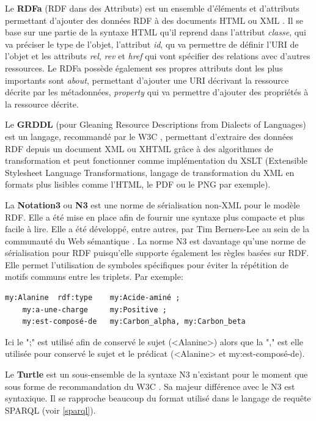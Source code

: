 Le \textbf{RDFa} (RDF dans des Attributs) est un ensemble d'éléments et d'attributs permettant d'ajouter des données RDF à des documents HTML ou XML \cite{adida2008rdfa}. Il se base sur une partie de la syntaxe HTML qu'il reprend dans l'attribut \textit{classe}, qui va préciser le type de l'objet, l'attribut \textit{id}, qu va permettre de définir l'URI de l'objet et les attributs \textit{rel}, \textit{rev} et \textit{href} qui vont spécifier des relations avec d'autres ressources. Le RDFa possède également ses propres attributs dont les plus importants sont \textit{about}, permettant d'ajouter une URI décrivant la ressource décrite par les métadonnées, \textit{property} qui va permettre d'ajouter des propriétés à la ressource décrite.

Le \textbf{GRDDL} (pour Gleaning Resource Descriptions from Dialects of Languages) est un langage, recommandé par le W3C \cite{connolly2007gleaning}, permettant d'extraire des données RDF depuis un document XML ou XHTML grâce à des algorithmes de transformation et peut fonctionner comme implémentation du XSLT (Extensible Stylesheet Language Transformations, langage de transformation du XML en formats plus lisibles comme l'HTML, le PDF ou le PNG par exemple).

La \textbf{Notation3} ou \textbf{N3} est une norme de sérialisation non-XML pour le modèle RDF. Elle a été mise en place afin de fournir une syntaxe plus compacte et plus facile à lire. Elle a été développé, entre autres, par Tim Berners-Lee au sein de la communauté du Web sémantique \cite{berners2008n3logic}. La norme N3 est davantage qu'une norme de sérialisation pour RDF puisqu'elle supporte également les règles basées sur RDF. Elle permet l'utilisation de symboles spécifiques pour éviter la répétition de motifs communs entre les triplets. Par exemple:

\begin{lstlisting}
my:Alanine	rdf:type 	my:Acide-aminé ; 
	my:a-une-charge		my:Positive ; 
	my:est-composé-de 	my:Carbon_alpha, my:Carbon_beta	
\end{lstlisting} 


Ici le ";" est utilisé afin de conservé le sujet (<Alanine>) alors que la "," est elle utilisée pour conservé le sujet et le prédicat (<Alanine> et my:est-composé-de).

Le \textbf{Turtle} est un sous-ensemble de la syntaxe N3 n'existant pour le moment que sous forme de recommandation du W3C \cite{prud2013turtle}. Sa majeur différence avec le N3 est syntaxique. Il se rapproche beaucoup du format utilisé dans le langage de requête SPARQL (voir \ref{sparql}).

